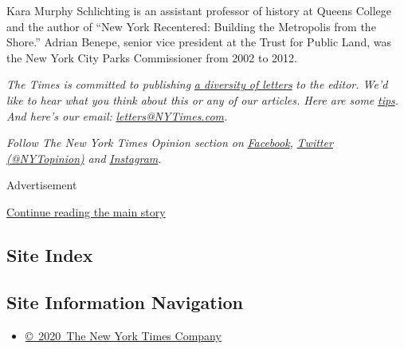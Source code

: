 Kara Murphy Schlichting is an assistant professor of history at Queens
College and the author of ``New York Recentered: Building the Metropolis
from the Shore.'' Adrian Benepe, senior vice president at the Trust for
Public Land, was the New York City Parks Commissioner from 2002 to 2012.

\emph{The Times is committed to publishing}
\href{https://www.nytimes3xbfgragh.onion/2019/01/31/opinion/letters/letters-to-editor-new-york-times-women.html}{\emph{a
diversity of letters}} \emph{to the editor. We'd like to hear what you
think about this or any of our articles. Here are some}
\href{https://help.nytimes3xbfgragh.onion/hc/en-us/articles/115014925288-How-to-submit-a-letter-to-the-editor}{\emph{tips}}\emph{.
And here's our email:}
\href{mailto:letters@NYTimes.com}{\emph{letters@NYTimes.com}}\emph{.}

\emph{Follow The New York Times Opinion section on}
\href{https://www.facebookcorewwwi.onion/nytopinion}{\emph{Facebook}}\emph{,}
\href{http://twitter.com/NYTOpinion}{\emph{Twitter (@NYTopinion)}}
\emph{and}
\href{https://www.instagram.com/nytopinion/}{\emph{Instagram}}\emph{.}

Advertisement

\protect\hyperlink{after-bottom}{Continue reading the main story}

\hypertarget{site-index}{%
\subsection{Site Index}\label{site-index}}

\hypertarget{site-information-navigation}{%
\subsection{Site Information
Navigation}\label{site-information-navigation}}

\begin{itemize}
\tightlist
\item
  \href{https://help.nytimes3xbfgragh.onion/hc/en-us/articles/115014792127-Copyright-notice}{©~2020~The
  New York Times Company}
\end{itemize}

